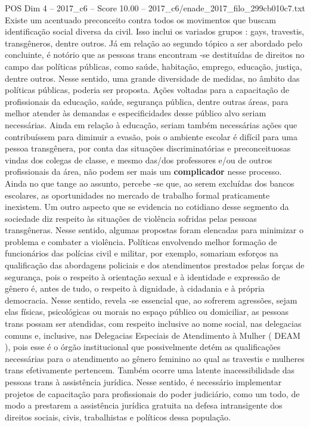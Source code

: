 \begin{textsample}{POS Dim 4 – 2017\_c6 – Score 10.00 – 2017\_c6/enade\_2017\_filo\_299cb010c7.txt}
Existe um acentuado preconceito contra todos os movimentos que buscam identificação social diversa da civil.
Isso inclui os variados grupos : gays, travestis, transgêneros, dentre outros.
Já em relação ao segundo tópico a ser abordado pelo concluinte, é notório que as pessoas trans encontram -se destituídas de direitos no campo das políticas públicas, como saúde, habitação, emprego, educação, justiça, dentre outros.
Nesse sentido, uma grande diversidade de medidas, no âmbito das políticas públicas, poderia ser proposta.
Ações voltadas para a capacitação de profissionais da educação, saúde, segurança pública, dentre outras áreas, para melhor atender às demandas e especificidades desse público alvo seriam necessárias.
Ainda em relação à educação, seriam também necessárias ações que contribuíssem para diminuir a evasão, pois o ambiente escolar é difícil para uma pessoa transgênera, por conta das situações discriminatórias e preconceituosas vindas dos colegas de classe, e mesmo das/dos professores e/ou de outros profissionais da área, não podem ser mais um \textbf{complicador} nesse processo.
Ainda no que tange ao assunto, percebe -se que, ao serem excluídas dos bancos escolares, as oportunidades no mercado de trabalho formal praticamente inexistem.
Um outro aspecto que se evidencia no cotidiano desse segmento da sociedade diz respeito às situações de violência sofridas pelas pessoas transgêneras.
Nesse sentido, algumas propostas foram elencadas para minimizar o problema e combater a violência.
Políticas envolvendo melhor formação de funcionários das polícias civil e militar, por exemplo, somariam esforços na qualificação das abordagens policiais e dos atendimentos prestados pelas forças de segurança, pois o respeito à orientação sexual e à identidade e expressão de gênero é, antes de tudo, o respeito à dignidade, à cidadania e à própria democracia.
Nesse sentido, revela -se essencial que, ao sofrerem agressões, sejam elas físicas, psicológicas ou morais no espaço público ou domiciliar, as pessoas trans possam ser atendidas, com respeito inclusive ao nome social, nas delegacias comuns e, inclusive, nas Delegacias Especiais de Atendimento à Mulher ( DEAM ), pois esse é o órgão institucional que possivelmente detém as qualificações necessárias para o atendimento ao gênero feminino ao qual as travestis e mulheres trans efetivamente pertencem.
Também ocorre uma latente inacessibilidade das pessoas trans à assistência jurídica.
Nesse sentido, é necessário implementar projetos de capacitação para profissionais do poder judiciário, como um todo, de modo a prestarem a assistência jurídica gratuita na defesa intransigente dos direitos sociais, civis, trabalhistas e políticos dessa população.

\end{textsample}
